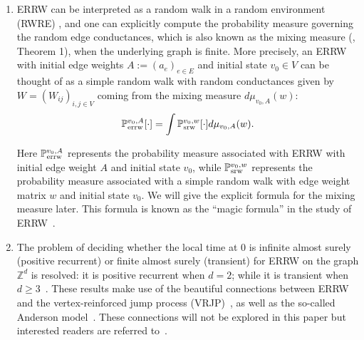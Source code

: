 \documentclass[a4paper, 11pt]{article}
\renewcommand{\P}{\mathbb{P}}
\newcommand{\Psrw}{\P_{\textnormal{srw}}}
\newcommand{\Perrw}{\P_{\textnormal{errw}}}
\newif\ifva
\begin{document}
\begin{enumerate}
    \item ERRW can be interpreted as a random walk in a random environment (RWRE) \cite{kr00}, and one can explicitly compute the probability measure governing the random edge conductances, which is also known as the mixing measure (\cite{mr2}, Theorem 1), when the underlying graph is finite. More precisely, an ERRW with initial edge weights $A:=(a_e)_{e\in E}$ and initial state $v_0\in V$ can be thought of as a simple random walk with random conductances given by $W=(W_{ij})_{i,j\in V}$ coming from the mixing measure $d\mu_{v_0,A}(w)$:
    \[\Perrw^{v_0, A}[\cdot]=\int\Psrw^{v_0, w}[\cdot]d\mu_{v_0,A}(w).\]
    
    Here $\Perrw^{v_0, A}$ represents the probability measure associated with ERRW with initial edge weight $A$ and initial state $v_0$, while $\Psrw^{v_0, w}$ represents the probability measure associated with a simple random walk with edge weight matrix $w$ and initial state $v_0$. We will give the explicit formula for the mixing measure later. This formula is known as the ``magic formula'' in the study of ERRW~\cite{dr,mr2}.
    \ifva
\color{red}
\color{black}
\fi

    \item The problem of deciding whether the local time at 0 is infinite almost surely (positive recurrent) or finite almost surely (transient) for ERRW on the graph $\mathbb{Z}^d$ is resolved: it is positive recurrent when $d=2$; while it is transient when $d\geq 3$~\cite{st, bhs}. These results make use of the beautiful connections between ERRW and the vertex-reinforced jump process (VRJP)~\cite{st}, as well as the so-called Anderson model~\cite{bhs, st}. These connections will not be explored in this paper but interested readers are referred to~\cite{bhs, st}.
\end{enumerate}
\end{document}
